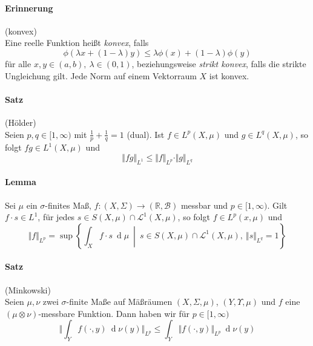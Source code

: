 \documentclass[12pt,a4paper,fleqn]{article}
\def\set#1{{\left\{ #1 \right\}}}
\def\Mid{\ \middle|\ }
\def\d{{\operatorname{d}}}
\begin{document}
\paragraph{Erinnerung} (konvex)\\
Eine reelle Funktion heißt \textit{konvex}, falls
\begin{displaymath}
\phi(\lambda x + (1 - \lambda) y ) \leq \lambda \phi (x) + (1 - \lambda) \phi(y)
\end{displaymath}
für alle $x, y \in (a, b),\ \lambda \in (0,1)$, beziehungsweise \textit{strikt konvex}, falls die strikte Ungleichung gilt. Jede Norm auf einem Vektorraum $X$ ist konvex.

\paragraph{Satz} (Hölder)\\
Seien $p, q \in [1, \infty)$ mit $\frac{1}{p} + \frac{1}{q} = 1$ (dual). Ist $f \in L^p(X, \mu)$ und $g \in L^{q}(X, \mu)$, so folgt $fg \in {L}^1(X, \mu)$ und 
\begin{displaymath}
\Vert fg \Vert_{L^1} \leq \Vert f \Vert_{L^p} \cdot \Vert g \Vert_{L^{q}}
\end{displaymath}

\paragraph{Lemma} Sei $\mu$ ein $\sigma$-finites Maß, $f\colon (X, \Sigma) \rightarrow (\mathbb{R}, \mathcal{B})$ messbar und $p \in [1, \infty)$. Gilt $f \cdot s \in {L}^1$, für jedes $s \in S(X, \mu) \cap \mathscr{L}^1(X, \mu)$, so folgt $f \in {L}^p(x, \mu)$ und 
\begin{displaymath}
\Vert f \Vert_{L^p} = \sup \set{ \int_X f \cdot s\ \d\mu \Mid s \in S(X, \mu) \cap \mathscr{L}^1(X, \mu),\ \Vert s \Vert_{L^{q}} = 1 }
\end{displaymath}

\paragraph{Satz} (Minkowski)\\
Seien $\mu, \nu$ zwei $\sigma$-finite Maße auf Mäßräumen $(X, \Sigma, \mu)$, $(Y, \Upsilon, \mu)$ und $f$ eine\linebreak \mbox{$(\mu \otimes \nu)$-messbare} Funktion. Dann haben wir für $p \in [1, \infty)$
\begin{displaymath}
\bigg \Vert \int_Y f(\cdot, y)\ \d\nu(y)\bigg\Vert_{L^p} \leq \int_Y \Vert f(\cdot, y) \Vert_{L^p} \ \d\nu(y)
\end{displaymath}
\end{document}
